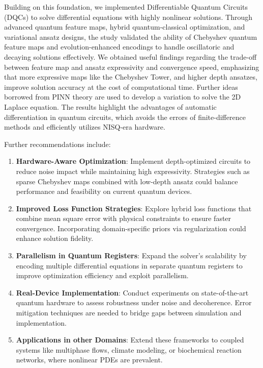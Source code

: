 \documentclass[11pt,a4paper]{article}
\begin{document}
{Building on this foundation, we implemented Differentiable Quantum Circuits (DQCs) to solve differential equations with highly nonlinear solutions. Through advanced quantum feature maps, hybrid quantum-classical optimization, and variational ansatz designs, the study validated the ability of Chebyshev quantum feature maps and evolution-enhanced encodings to handle oscillatoric and decaying solutions effectively. We obtained useful findings regarding the trade-off between feature map and ansatz expressivity and convergence speed, emphasizing that more expressive maps like the Chebyshev Tower, and higher depth ansatzes, improve solution accuracy at the cost of computational time. Further ideas borrowed from PINN theory are used to develop a variation to solve the 2D Laplace equation. The results highlight the advantages of automatic differentiation in quantum circuits, which avoids the errors of finite-difference methods and efficiently utilizes NISQ-era hardware.

Further recommendations include:

\begin{enumerate}
    \item \textbf{Hardware-Aware Optimization}: Implement depth-optimized circuits to reduce noise impact while maintaining high expressivity. Strategies such as sparse Chebyshev maps combined with low-depth ansatz could balance performance and feasibility on current quantum devices.
    \item \textbf{Improved Loss Function Strategies}: Explore hybrid loss functions that combine mean square error with physical constraints to ensure faster convergence. Incorporating domain-specific priors via regularization could enhance solution fidelity.
    \item \textbf{Parallelism in Quantum Registers}: Expand the solver’s scalability by encoding multiple differential equations in separate quantum registers to improve optimization efficiency and exploit parallelism.
    \item \textbf{Real-Device Implementation}: Conduct experiments on state-of-the-art quantum hardware to assess robustness under noise and decoherence. Error mitigation techniques are needed to bridge gaps between simulation and implementation.
    \item \textbf{Applications in other Domains}: Extend these frameworks to coupled systems like multiphase flows, climate modeling, or biochemical reaction networks, where nonlinear PDEs are prevalent.
\end{enumerate}

}
\end{document}
